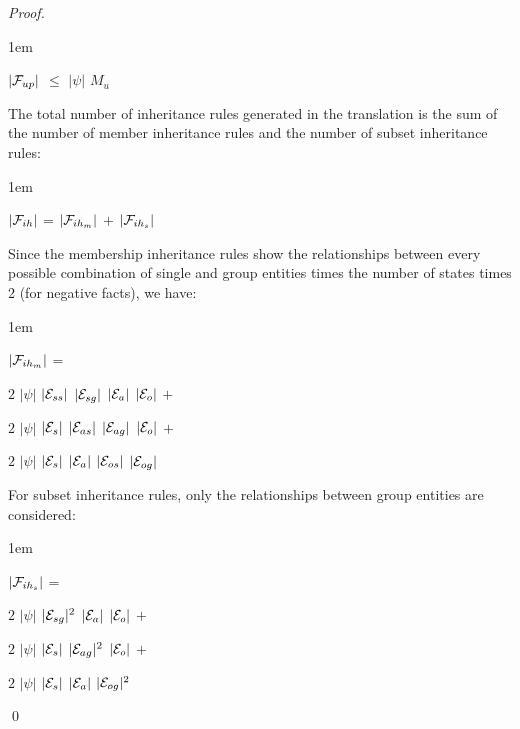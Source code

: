 \documentclass[global,twocolumn,final]{svjour}
\newenvironment{vproof}
  {\begin{proof}\hspace{0.25em}}
  {\qed\end{proof}}
\newenvironment{vquote}
  {\begin{list}{}{\leftmargin 1em}\item[]}
  {\end{list}}
\begin{document}
\begin{vproof}
          \begin{vquote}
            $|{\cal F}_{up}|$ $\leq$ $|\psi|$ $M_{u}$
          \end{vquote}

          The total number of inheritance rules generated in the translation is
          the sum of the number of member inheritance rules and the number of
          subset inheritance rules:

          \begin{vquote}
            $|{\cal F}_{ih}|$ =
            $|{\cal F}_{ih_{m}}|$ $+$
            $|{\cal F}_{ih_{s}}|$
          \end{vquote}

          Since the membership inheritance rules show the relationships between
          every possible combination of single and group entities times the
          number of states times 2 (for negative facts), we have:

          \begin{vquote}
            $|{\cal F}_{ih_{m}}|$ =

            \hspace{1em}
            $2$ $|\psi|$ $|{\cal E}_{ss}|$ $|{\cal E}_{sg}|$ $|{\cal E}_{a}|$ $|{\cal E}_{o}|$ $+$

            \hspace{1em}
            $2$ $|\psi|$ $|{\cal E}_{s}|$ $|{\cal E}_{as}|$ $|{\cal E}_{ag}|$ $|{\cal E}_{o}|$ $+$

            \hspace{1em}
            $2$ $|\psi|$ $|{\cal E}_{s}|$ $|{\cal E}_{a}|$ $|{\cal E}_{os}|$ $|{\cal E}_{og}|$
          \end{vquote}

          For subset inheritance rules, only the relationships between group
          entities are considered:

          \begin{vquote}
            $|{\cal F}_{ih_{s}}|$ =

            \hspace{1em}
            $2$ $|\psi|$ $|{\cal E}_{sg}|^{2}$ $|{\cal E}_{a}|$ $|{\cal E}_{o}|$ $+$

            \hspace{1em}
            $2$ $|\psi|$ $|{\cal E}_{s}|$ $|{\cal E}_{ag}|^{2}$ $|{\cal E}_{o}|$ $+$

            \hspace{1em}
            $2$ $|\psi|$ $|{\cal E}_{s}|$ $|{\cal E}_{a}|$ $|{\cal E}_{og}|^{2}$
          \end{vquote}


\end{vproof}
\end{document}
